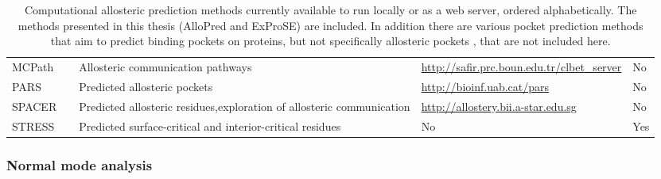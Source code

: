 \begin{table}
\begin{footnotesize}
\begin{tabular}{ l l p{5cm} l p{3cm} }
MCPath        & \cite{Kaya2013}                         & Allosteric communication pathways                                              & \url{http://safir.prc.boun.edu.tr/clbet_server} & No                                            \\
PARS          & \cite{Panjkovich2014, Panjkovich2012}   & Predicted allosteric pockets                                                   & \url{http://bioinf.uab.cat/pars}                & No                                            \\
SPACER        & \cite{Goncearenco2013, Mitternacht2011} & Predicted allosteric residues,\newline exploration of allosteric communication & \url{http://allostery.bii.a-star.edu.sg}        & No                                            \\
STRESS        & \cite{Clarke2016}                       & Predicted surface-critical and interior-critical residues                      & No                                              & Yes                                           \\
\hline
\end{tabular}
\end{footnotesize}

\caption[Computational allosteric prediction methods currently available to run locally or as a web server]
{Computational allosteric prediction methods currently available to run locally or as a web server, ordered alphabetically.
The methods presented in this thesis (AlloPred and ExProSE) are included.
In addition there are various pocket prediction methods that aim to predict binding pockets on proteins, but not specifically allosteric pockets \cite{Huang2006, LeGuilloux2009, Cimermancic2016}, that are not included here.}

\label{tab:prediction_methods}
\end{table}


\subsubsection{Normal mode analysis}


